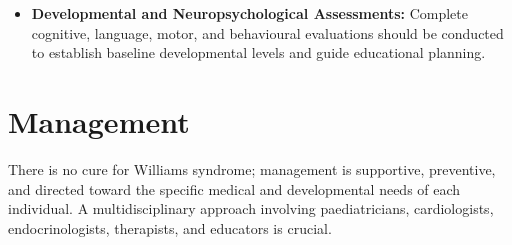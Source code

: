 \begin{itemize}
\begin{itemize}
        \item \textbf{Urinary Calcium-to-Creatinine Ratio:} Performed annually to screen for hypercalciuria, which can lead to kidney stones and nephrocalcinosis.
        \item \textbf{Renal Function Tests and Renal Ultrasound:} Evaluated at diagnosis and periodically thereafter to monitor kidney function and screen for nephrocalcinosis or structural renal anomalies.
        \item \textbf{Thyroid Function Tests (TSH and Free T4):} Checked at baseline and annually to screen for hypothyroidism.
        \item \textbf{Glucose Tolerance Testing:} Performed in adolescents and adults to monitor for impaired glucose tolerance and diabetes mellitus.
    \end{itemize}
    \item \textbf{Developmental and Neuropsychological Assessments:} Complete cognitive, language, motor, and behavioural evaluations should be conducted to establish baseline developmental levels and guide educational planning.
\end{itemize}

\section*{Management}
There is no cure for Williams syndrome; management is supportive, preventive, and directed toward the specific medical and developmental needs of each individual. A multidisciplinary approach involving paediatricians, cardiologists, endocrinologists, therapists, and educators is crucial.

